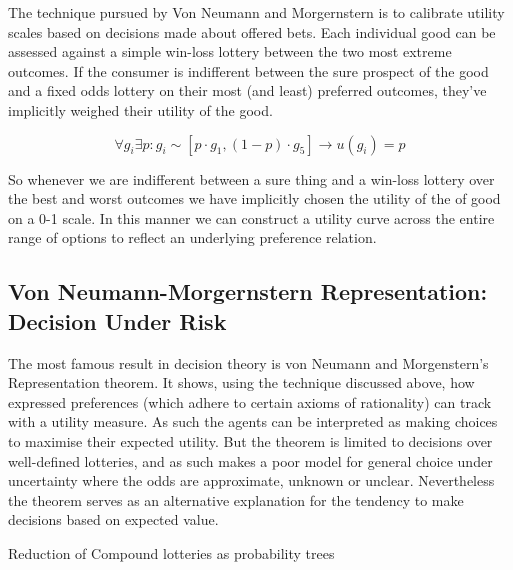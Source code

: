 \documentclass{tufte-handout}
\begin{document}
\noindent The technique pursued by Von Neumann and Morgernstern is to calibrate utility scales based on decisions made about offered bets. Each individual good can be assessed against a simple win-loss lottery between the two most extreme outcomes. If the consumer is indifferent between the sure prospect of the good and a fixed odds lottery on their most (and least) preferred outcomes, they've implicitly weighed their utility of the good. 

$$ \forall g_i \exists  p :  g _{i} \sim [p \cdot g_{1}, (1-p)\cdot g_{5}] \rightarrow u(g_{i}) = p $$

\noindent So whenever we are indifferent between a sure thing and a win-loss lottery over the best and worst outcomes we have implicitly chosen the utility of the of good on a 0-1 scale. In this manner we can construct a utility curve across the entire range of options to reflect an underlying preference relation.

\subsection{Von Neumann-Morgernstern Representation: Decision Under Risk}
The most famous result in decision theory is von Neumann and Morgenstern's Representation theorem. It shows, using the technique discussed above, how expressed preferences (which adhere to certain axioms of rationality) can track with a utility measure. As such the agents can be interpreted as making choices to maximise their expected utility. But the theorem is limited to decisions over well-defined lotteries, and as such makes a poor model for general choice under uncertainty where the odds are approximate, unknown or unclear. Nevertheless the theorem serves as an alternative explanation for the tendency to make decisions based on expected value. 

\begin{marginfigure}
\caption{Reduction of Compound lotteries as probability trees}%
  
  \label{fig:compound lotteries}%
\end{marginfigure}
\end{document}
